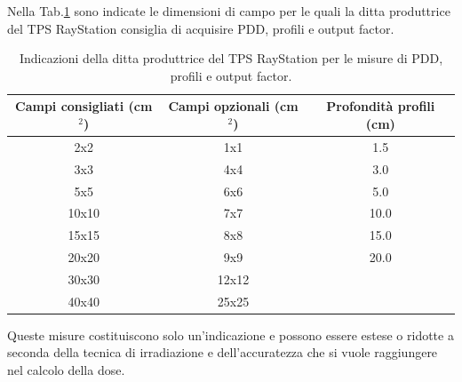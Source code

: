Nella Tab.\ref{tab:meas} sono indicate le dimensioni di campo per le quali la ditta produttrice del TPS RayStation consiglia di acquisire PDD, profili e  output factor.
\begin{table}
\begin{tabular}{@{}ccc@{}}
\toprule
Campi consigliati (cm$^2$) & Campi opzionali (cm$^2$) & Profondità profili (cm)\\
\midrule
2x2 & 1x1 & 1.5\\
3x3 & 4x4 & 3.0\\
5x5 & 6x6 & 5.0\\
10x10 & 7x7 & 10.0\\
15x15 & 8x8 & 15.0\\
20x20 & 9x9 & 20.0\\
30x30 & 12x12 & \\
40x40 & 25x25 & \\
\bottomrule
\end{tabular}
\caption{Indicazioni della ditta produttrice del TPS RayStation per le misure di PDD, profili e output factor.}
\label{tab:meas}
\end{table}
Queste misure costituiscono solo un'indicazione e possono essere estese o ridotte a seconda della tecnica di irradiazione e dell'accuratezza che si vuole raggiungere nel calcolo della dose.


